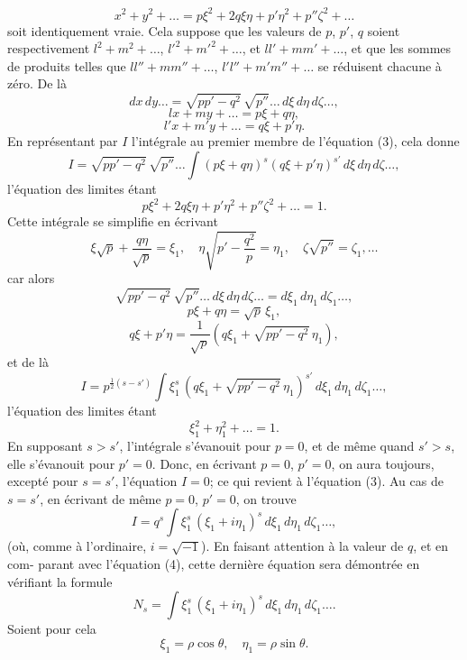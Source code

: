 \documentclass[11pt]{article}
\begin{document}
\[
x^{2} + y^{2} + \ldots = p\xi^{2} + 2q\xi\eta + p'\eta^{2} + p''\zeta^{2} + \ldots
\]
soit identiquement vraie. Cela suppose que les valeurs de $p$, $p'$, $q$ soient respectivement
$l^{2} + m^{2} + \ldots$, $l'^{2} + m'^{2} + \ldots$, et $ll' + mm' + \ldots$, et que les sommes de produits telles que
$ll'' + mm'' + \ldots$, $l'l'' + m'm'' + \ldots$ se r\'eduisent chacune \`a z\'ero. De l\`a
\[
dx\,dy\ldots = \sqrt{pp' - q^{2}}\,\sqrt{p''}\ldots\,d\xi\,d\eta\,d\zeta\ldots,
\]
\[
lx + my + \ldots = p\xi + q\eta,
\]
\[
l'x + m'y + \ldots = q\xi + p'\eta.
\]
En repr\'esentant par $I$ l'int\'egrale au premier membre de l'\'equation (3), cela donne
\[
I = \sqrt{pp' - q^{2}}\,\sqrt{p''}\ldots\int(p\xi + q\eta)^{s}(q\xi + p'\eta)^{s'}\,d\xi\,d\eta\,d\zeta\ldots,
\]
l'\'equation des limites \'etant
\[
p\xi^{2} + 2q\xi\eta + p'\eta^{2} + p''\zeta^{2} + \ldots = 1.
\]
Cette int\'egrale se simplifie en \'ecrivant
\[
\xi\sqrt{p} + \frac{q\eta}{\sqrt{p}} = \xi_{1},\quad \eta\sqrt{p' - \frac{q^{2}}{p}} = \eta_{1},\quad \zeta\sqrt{p''} = \zeta_{1},\ldots
\]
car alors
\[
\sqrt{pp' - q^{2}}\,\sqrt{p''}\ldots\,d\xi\,d\eta\,d\zeta\ldots = d\xi_{1}\,d\eta_{1}\,d\zeta_{1}\ldots,
\]
\[
p\xi + q\eta = \sqrt{p}\,\xi_{1},
\]
\[
q\xi + p'\eta = \frac{1}{\sqrt{p}}\!\left(q\xi_{1} + \sqrt{pp' - q^{2}}\,\eta_{1}\right),
\]
et de l\`a
\[
I = p^{\tfrac{1}{2}(s - s')}\!\int\!\xi_{1}^{s}\,(q\xi_{1} + \sqrt{pp' - q^{2}}\,\eta_{1})^{s'}\,d\xi_{1}\,d\eta_{1}\,d\zeta_{1}\ldots,
\]
l'\'equation des limites \'etant
\[
\xi_{1}^{2} + \eta_{1}^{2} + \ldots = 1.
\]
En supposant $s > s'$, l'int\'egrale s'\'evanouit pour $p = 0$, et de m\^eme quand $s' > s$, elle
s'\'evanouit pour $p' = 0$. Donc, en \'ecrivant $p = 0$, $p' = 0$, on aura toujours, except\'e pour
$s = s'$, l'\'equation $I = 0$; ce qui revient \`a l'\'equation (3). Au cas de $s = s'$, en \'ecrivant de
m\^eme $p = 0$, $p' = 0$, on trouve
\[
I = q^{s}\!\int\!\xi_{1}^{s}\,(\xi_{1} + i\eta_{1})^{s}\,d\xi_{1}\,d\eta_{1}\,d\zeta_{1}\ldots,
\]
(o\`u, comme \`a l'ordinaire, $i = \sqrt{-1}$). En faisant attention \`a la valeur de $q$, et en com-
parant avec l'\'equation (4), cette derni\`ere \'equation sera d\'emontr\'ee en v\'erifiant la formule
\[
N_{s} = \int\!\xi_{1}^{s}\,(\xi_{1} + i\eta_{1})^{s}\,d\xi_{1}\,d\eta_{1}\,d\zeta_{1}\ldots.
\]
Soient pour cela
\[
\xi_{1} = \rho\cos\theta,\quad \eta_{1} = \rho\sin\theta.
\]
\end{document}
